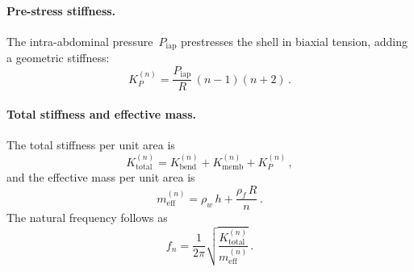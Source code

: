 \documentclass[12pt]{article}
\begin{document}
\paragraph{Pre-stress stiffness.}
The intra-abdominal pressure~$P_{\mathrm{iap}}$ prestresses the shell in
biaxial tension, adding a geometric stiffness:
\begin{equation}
  K_{P}^{(n)} = \frac{P_{\mathrm{iap}}}{R}\,(n-1)(n+2) \,.
  \tag{S5}
  \label{eq:KP}
\end{equation}

\paragraph{Total stiffness and effective mass.}
The total stiffness per unit area is
\begin{equation}
  K_{\mathrm{total}}^{(n)} = K_{\mathrm{bend}}^{(n)} + K_{\mathrm{memb}}^{(n)} + K_{P}^{(n)} \,,
  \tag{S6}
  \label{eq:Ktotal}
\end{equation}
and the effective mass per unit area is
\begin{equation}
  m_{\mathrm{eff}}^{(n)} = \rho_{w}\,h + \frac{\rho_{f}\,R}{n} \,.
  \tag{S7}
  \label{eq:meff}
\end{equation}
The natural frequency follows as
\begin{equation}
  \boxed{
    f_{n} = \frac{1}{2\pi}\sqrt{\frac{K_{\mathrm{total}}^{(n)}}{m_{\mathrm{eff}}^{(n)}}}
  } \,.
  \tag{S8}
  \label{eq:fn}
\end{equation}
\end{document}
